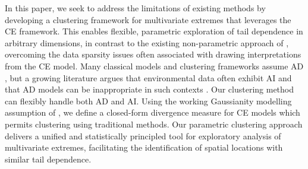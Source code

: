 \documentclass[12pt]{article}
\begin{document}
In this paper, we seek to address the limitations of existing methods by developing a clustering framework for multivariate extremes that leverages the CE framework. 
This enables flexible, parametric exploration of tail dependence in arbitrary dimensions, in contrast to the existing non-parametric approach of \citet{Vignotto2021}, overcoming the data sparsity issues often associated with drawing interpretations from the CE model.
Many classical models and clustering frameworks assume AD \citep{Vignotto2021,Boulin2025}, but a growing literature argues that environmental data often exhibit AI and that AD models can be inappropriate in such contexts \citep{Opitz2016,Dawkins2018,Huser2024}. 
Our clustering method can flexibly handle both AD and AI. 
Using the working Gaussianity modelling assumption of \citet{Heffernan2004}, we define a closed-form divergence measure for CE models which permits clustering using traditional methods.
Our parametric clustering approach delivers a unified and statistically principled tool for exploratory analysis of multivariate extremes, facilitating the identification of spatial locations with similar tail dependence. 
\end{document}

